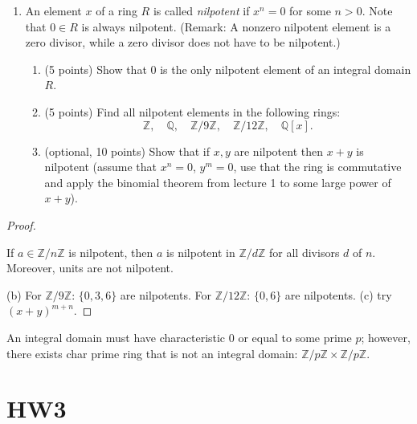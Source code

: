 \documentclass[openany]{book}
\newcommand{\Z}{\mathbb{Z}}
\begin{document}
\begin{prob}[6]
    \begin{enumerate}
        \item[6.] An element \( x \) of a ring \( R \) is called \textit{nilpotent} if \( x^n = 0 \) for some \( n > 0 \). Note that \( 0 \in R \) is always nilpotent. (Remark: A nonzero nilpotent element is a zero divisor, while a zero divisor does not have to be nilpotent.)
        
        \begin{enumerate}
            \item[(a)] (5 points) Show that \( 0 \) is the only nilpotent element of an integral domain \( R \).
            
            \item[(b)] (5 points) Find all nilpotent elements in the following rings:
            \[
            \mathbb{Z}, \quad \mathbb{Q}, \quad \mathbb{Z}/9\mathbb{Z}, \quad \mathbb{Z}/12\mathbb{Z}, \quad \mathbb{Q}[x].
            \]
            
            \item[(c)] (optional, 10 points) Show that if \( x, y \) are nilpotent then \( x + y \) is nilpotent (assume that \( x^n = 0 \), \( y^m = 0 \), use that the ring is commutative and apply the binomial theorem from lecture 1 to some large power of \( x + y \)).
        \end{enumerate}
    \end{enumerate}    
\end{prob}
\begin{proof}
    \begin{prop}
        If $a\in\Z/n\Z$ is nilpotent, then $a$ is nilpotent in $\Z/d\Z$ for all divisors $d$ of $n$. Moreover, units are not nilpotent.
    \end{prop}
    (b) For $\Z/9\Z$: $\{0,3,6\}$ are nilpotents. For $\Z/12\Z$: $\{0, 6\}$ are nilpotents. (c) try $(x+y)^{m+n}$.
\end{proof}

\begin{prop}
    An integral domain must have characteristic $0$ or equal to some prime $p$; however, there exists char prime ring that is not an integral domain: $\Z/p\Z\times\Z/p\Z$.
\end{prop}



\chapter{HW3}
\end{document}

